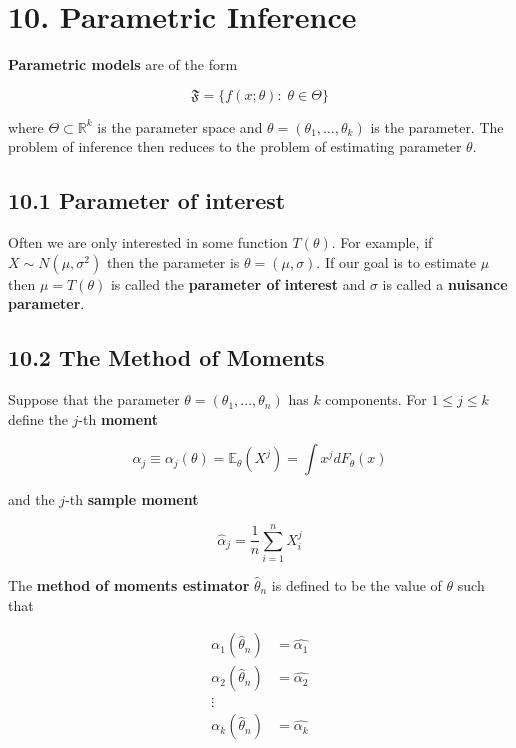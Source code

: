 \section*{10. Parametric Inference}\label{parametric-inference}

\textbf{Parametric models} are of the form

\[ \mathfrak{F} = \bigg\{ f(x; \theta) : \; \theta \in \Theta \bigg\} \]

where \(\Theta \subset \mathbb{R}^{k}\) is the parameter space and
\(\theta = (\theta_{1}, \dots, \theta_{k})\) is the parameter. The problem
of inference then reduces to the problem of estimating parameter
\(\theta\).

\subsection*{10.1 Parameter of interest}\label{parameter-of-interest}

Often we are only interested in some function \(T(\theta)\). For
example, if \(X \sim N(\mu, \sigma^{2})\) then the parameter is
\(\theta = (\mu, \sigma)\). If our goal is to estimate \(\mu\) then
\(\mu = T(\theta)\) is called the \textbf{parameter of interest} and
\(\sigma\) is called a \textbf{nuisance parameter}.

\subsection*{10.2 The Method of Moments}\label{the-method-of-moments}

Suppose that the parameter \(\theta = (\theta_{1}, \dots, \theta_{n})\) has
\(k\) components. For \(1 \leq j \leq k\) define the \(j\)-th
\textbf{moment}

\[ \alpha_{j} \equiv \alpha_{j}(\theta) = \mathbb{E}_\theta(X^{j}) = \int x^{j} dF_\theta(x)\]

and the \(j\)-th \textbf{sample moment}

\[ \hat{\alpha}_{j} = \frac{1}{n} \sum_{i=1}^{n} X_{i}^{j} \]

The \textbf{method of moments estimator} \(\hat{\theta}_{n}\) is defined
to be the value of \(\theta\) such that

\begin{align*}
\alpha_{1}(\hat{\theta}_{n}) &= \hat{\alpha_{1}} \\
\alpha_{2}(\hat{\theta}_{n}) &= \hat{\alpha_{2}} \\
\vdots \\
\alpha_{k}(\hat{\theta}_{n}) &= \hat{\alpha_{k}}  
\end{align*}

